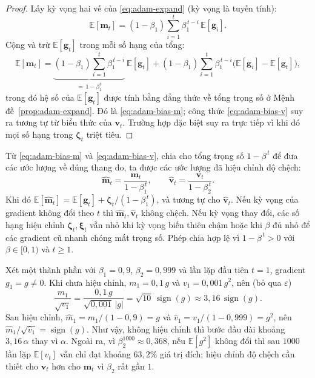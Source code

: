 \begin{proof}
Lấy kỳ vọng hai vế của \eqref{eq:adam-expand} (kỳ vọng là tuyến tính):
\begin{equation*}
  \mathbb{E}[\mathbf{m}_t]=(1-\beta_1)\sum_{i=1}^{t}\beta_1^{\,t-i}\,\mathbb{E}[\mathbf{g}_i].
\end{equation*}
Cộng và trừ $\mathbb{E}[\mathbf{g}_t]$ trong mỗi số hạng của tổng:
\begin{equation*}
  \mathbb{E}[\mathbf{m}_t]
  =\underbrace{(1-\beta_1)\sum_{i=1}^{t}\beta_1^{\,t-i}}_{=\,1-\beta_1^{\,t}}\ \mathbb{E}[\mathbf{g}_t]
  +(1-\beta_1)\sum_{i=1}^{t}\beta_1^{\,t-i}\big(\mathbb{E}[\mathbf{g}_i]-\mathbb{E}[\mathbf{g}_t]\big),
\end{equation*}
trong đó hệ số của $\mathbb{E}[\mathbf{g}_t]$ được tính bằng đẳng thức về tổng trọng số ở Mệnh đề~\ref{prop:adam-expand}. Đó là \eqref{eq:adam-bias-m}; công thức \eqref{eq:adam-bias-v} suy ra tương tự từ biểu thức của $\mathbf{v}_t$. Trường hợp đặc biệt suy ra trực tiếp vì khi đó mọi số hạng trong $\boldsymbol{\zeta}_t$ triệt tiêu.
\end{proof}

Từ \eqref{eq:adam-bias-m} và \eqref{eq:adam-bias-v}, chia cho tổng trọng số $1-\beta^{\,t}$ để đưa các ước lượng về đúng thang đo, ta được các ước lượng đã hiệu chỉnh độ chệch:
\begin{equation}\label{eq:adam-hat}
  \hat{\mathbf{m}}_t=\frac{\mathbf{m}_t}{1-\beta_1^{\,t}},
  \qquad
  \hat{\mathbf{v}}_t=\frac{\mathbf{v}_t}{1-\beta_2^{\,t}} .
\end{equation}
Khi đó $\mathbb{E}[\hat{\mathbf{m}}_t]=\mathbb{E}[\mathbf{g}_t]+\boldsymbol{\zeta}_t/(1-\beta_1^{\,t})$, và tương tự cho $\hat{\mathbf{v}}_t$. Nếu kỳ vọng của gradient không đổi theo $t$ thì $\hat{\mathbf{m}}_t,\hat{\mathbf{v}}_t$ không chệch. Nếu kỳ vọng thay đổi, các số hạng hiệu chỉnh $\boldsymbol{\zeta}_t,\boldsymbol{\xi}_t$ vẫn nhỏ khi kỳ vọng biến thiên chậm hoặc khi $\beta$ đủ nhỏ để các gradient cũ nhanh chóng mất trọng số. Phép chia hợp lệ vì $1-\beta^{\,t}>0$ với $\beta\in[0,1)$ và $t\ge1$.

\begin{example}
\label{ex:adam-bias}
Xét một thành phần với $\beta_1=0{,}9$, $\beta_2=0{,}999$ và lần lặp đầu tiên $t=1$, gradient $g_1=g\neq0$. Khi chưa hiệu chỉnh, $m_1=0{,}1\,g$ và $v_1=0{,}001\,g^{2}$, nên (bỏ qua $\varepsilon$)
\begin{equation*}
    \frac{m_1}{\sqrt{v_1}} = \frac{0{,}1\,g}{\sqrt{0{,}001}\,|g|} = \sqrt{10}\,\operatorname{sign}(g) \approx 3{,}16\,\operatorname{sign}(g).
\end{equation*}
Sau hiệu chỉnh, $\hat{m}_1 = m_1/(1-0{,}9) = g$ và $\hat{v}_1 = v_1/(1-0{,}999) = g^{2}$, nên $\hat{m}_1/\sqrt{\hat{v}_1} = \operatorname{sign}(g)$. Như vậy, không hiệu chỉnh thì bước đầu dài khoảng $3{,}16\,\alpha$ thay vì $\alpha$. Ngoài ra, vì $\beta_2^{1000} \approx 0{,}368$, nếu $\mathbb{E}[g^2]$ không đổi thì sau $1000$ lần lặp $\mathbb{E}[v_t]$ vẫn chỉ đạt khoảng $63{,}2\%$ giá trị đích; hiệu chỉnh độ chệch cần thiết cho $\mathbf{v}_t$ hơn cho $\mathbf{m}_t$ vì $\beta_2$ rất gần $1$.
\end{example}


